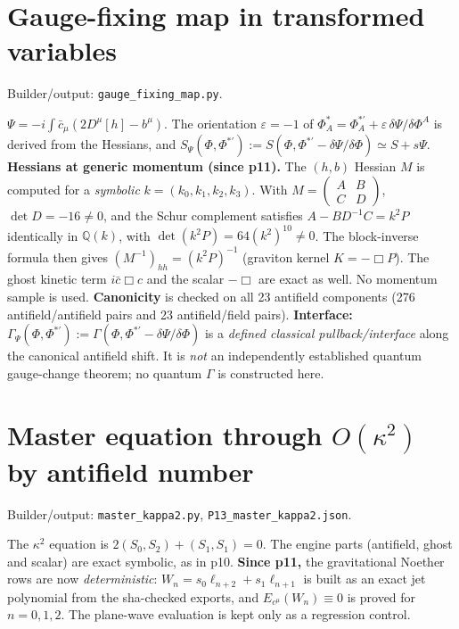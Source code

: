 \section{Gauge-fixing map in transformed variables}
\noindent Builder/output: \texttt{gauge\_fixing\_map.py}.\par\smallskip
$\Psi=-i\int\bar c_\mu(2D^\mu[h]-b^\mu)$. The orientation $\varepsilon=-1$ of
$\Phi^*_A=\Phi^{*\prime}_A+\varepsilon\,\delta\Psi/\delta\Phi^A$ is derived from the Hessians, and
$S_\Psi(\Phi,\Phi^{*\prime}):=S(\Phi,\Phi^{*\prime}-\delta\Psi/\delta\Phi)\simeq S+s\Psi$.
\textbf{Hessians at generic momentum (since p11).} The $(h,b)$ Hessian $M$ is computed for a \emph{symbolic}
$k=(k_0,k_1,k_2,k_3)$. With $M=\left(\begin{smallmatrix}A&B\\C&D\end{smallmatrix}\right)$, $\det D=-16\neq0$, and the Schur
complement satisfies $A-BD^{-1}C=k^2P$ identically in $\mathbb Q(k)$, with $\det(k^2P)=64(k^2)^{10}\neq0$. The
block-inverse formula then gives $(M^{-1})_{hh}=(k^2P)^{-1}$ (graviton kernel $K=-\Box P$). The ghost kinetic term
$i\bar c\Box c$ and the scalar $-\Box$ are exact as well. No momentum sample is used.
\textbf{Canonicity} is checked on all 23 antifield components (276 antifield/antifield pairs and 23 antifield/field
pairs). \textbf{Interface:} $\Gamma_\Psi(\Phi,\Phi^{*\prime}):=\Gamma(\Phi,\Phi^{*\prime}-\delta\Psi/\delta\Phi)$ is a
\emph{defined classical pullback/interface} along the canonical antifield shift. It is \emph{not} an independently
established quantum gauge-change theorem; no quantum $\Gamma$ is constructed here.

\section{Master equation through $O(\kappa^2)$ by antifield number}
\noindent Builder/output: \texttt{master\_kappa2.py}, \texttt{P13\_master\_kappa2.json}.\par\smallskip
The $\kappa^2$ equation is $2(S_0,S_2)+(S_1,S_1)=0$. The engine parts (antifield, ghost and scalar) are exact symbolic,
as in p10. \textbf{Since p11,} the gravitational Noether rows are now \emph{deterministic}:
$W_n=s_0\ell_{n+2}+s_1\ell_{n+1}$ is built as an exact jet polynomial from the sha-checked exports, and
$E_{c^\mu}(W_n)\equiv0$ is proved for $n=0,1,2$. The plane-wave evaluation is kept only as a regression control.

